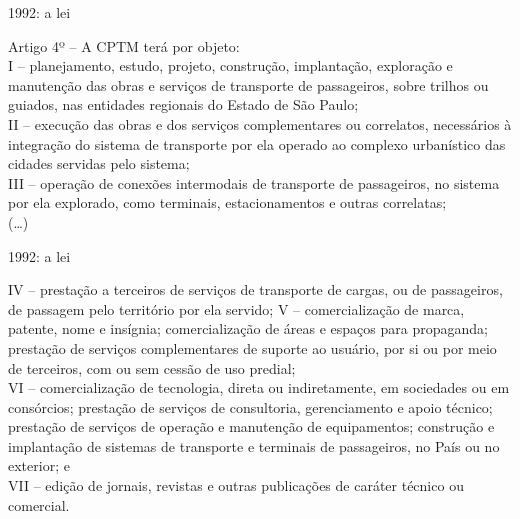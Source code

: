 \documentclass[spectratio=169, portuguese]{beamer}
\begin{document}
\begin{frame}{1992: a lei}
		
	\begin{exampleblock}{}
		Artigo 4º -- A CPTM terá por objeto:\\
		I -- planejamento, estudo, projeto, construção, implantação, exploração e manutenção das obras e serviços de transporte de passageiros, sobre trilhos ou guiados, nas entidades regionais do Estado de São Paulo;\\
		II -- execução das obras e dos serviços complementares ou correlatos, necessários à integração do sistema de transporte por ela operado ao complexo urbanístico das cidades servidas pelo sistema; \\
		III --  operação de conexões intermodais de transporte de passageiros, no sistema por ela explorado, como terminais, estacionamentos e outras correlatas;\\		
		(\dots)
	\end{exampleblock}
	
\end{frame}


\begin{frame}{1992: a lei}
	
	\begin{exampleblock}{}
		IV -- prestação a terceiros de serviços de transporte de cargas, ou de passageiros, de passagem pelo território por ela servido;
		V -- comercialização de marca, patente, nome e insígnia; comercialização de áreas e espaços para propaganda; prestação de serviços complementares de suporte ao usuário, por si ou por meio de terceiros, com ou sem cessão de uso predial;\\
		VI -- comercialização de tecnologia, direta ou indiretamente, em sociedades ou em consórcios; prestação de serviços de consultoria, gerenciamento e apoio técnico; prestação de serviços de operação e manutenção de equipamentos; construção e implantação de sistemas de transporte e terminais de passageiros, no País ou no exterior; e\\
		VII -- edição de jornais, revistas e outras publicações de caráter técnico ou comercial.\cite{lei7861}
	\end{exampleblock}

\end{frame}

\end{document}
